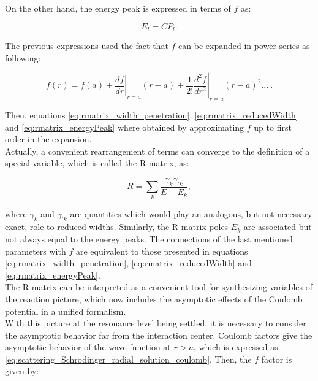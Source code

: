 \documentclass[openany]{book}
\begin{document}
On the other hand, the energy peak is expressed in terms of $f$ as: 

\begin{equation}  \label{eq:rmatrix_energyPeak}
	E_l =  C P_l.
\end{equation}

The previous expressions used the fact that $f$ can be expanded in power series as following: 

\begin{equation}   \label{eq:rmatrix_f_powerSeries}
	f(r) = f(a) + \left.\frac{df}{dr}\right|_{r = a} (r - a) +  \frac{1}{2!} \left.\frac{d^2f}{dr^2}\right|_{r = a} (r - a )^2  ... \ .
\end{equation}

Then, equations \ref{eq:rmatrix_width_penetration},     \ref{eq:rmatrix_reducedWidth} and \ref{eq:rmatrix_energyPeak} where obtained by approximating $f$ up to first order in the expansion.\\

Actually, a convenient rearrangement of terms can converge to the definition of a special variable, which is called the R-matrix, as: 

\begin{equation}  \label{eq:rmatrix_definition1}
	R= \sum_k {\frac{\gamma_{k} \gamma_{'k}}{E - E_k}}, 
\end{equation}

where $\gamma_{k} $ and $\gamma_{'k}$ are quantities which would play an analogous, but not necessary exact, role to reduced widths. Similarly, the R-matrix poles $E_k$ are associated but not always equal to the energy peaks. The connections of the last mentioned parameters with $f$ are equivalent to those presented in equations \ref{eq:rmatrix_width_penetration},     \ref{eq:rmatrix_reducedWidth} and \ref{eq:rmatrix_energyPeak}.   \\

The R-matrix can be interpreted as a convenient tool for synthesizing variables of the reaction picture, which now includes the asymptotic effects of the Coulomb potential in a unified formalism. \\

With this picture at the resonance level being settled, it is necessary to consider the asymptotic behavior far from the interaction center. Coulomb factors give the asymptotic behavior of the wave function at $r > a$, which is expressed as \ref{eq:scattering_Schrodinger_radial_solution_coulomb}. Then, the $f$ factor is given by: 
\end{document}
